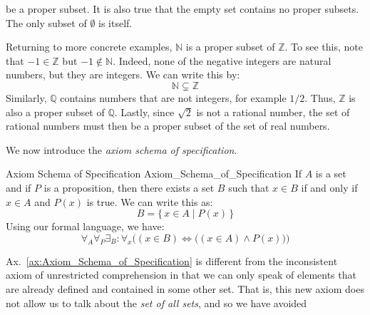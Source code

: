         be a proper subset. It is also true that the empty set contains no
        proper subsets. The only subset of $\emptyset$ is itself.
        \begin{example}
            Returning to more concrete examples, $\mathbb{N}$ is a proper subset
            of $\mathbb{Z}$. To see this, note that $\minus{1}\in\mathbb{Z}$ but
            $\minus{1}\notin\mathbb{N}$. Indeed, none of the negative integers
            are natural numbers, but they are integers. We can write this by:
            \begin{equation}
                \mathbb{N}\subsetneq\mathbb{Z}
            \end{equation}
            Similarly, $\mathbb{Q}$ contains numbers that are not integers,
            for example $1/2$. Thus, $\mathbb{Z}$ is also a proper subset of
            $\mathbb{Q}$. Lastly, since $\sqrt{2}$ is not a rational number, the
            set of rational numbers must then be a proper subset of the set of
            real numbers.
        \end{example}
        We now introduce the \textit{axiom schema of specification}.
        \begin{faxiom}{Axiom Schema of Specification}
                      {Axiom_Schema_of_Specification}
            If $A$ is a set and if $P$ is a proposition, then there exists a set
            $B$ such that $x\in{B}$ if and only if $x\in{A}$ and $P(x)$ is true.
            We can write this as:
            \begin{equation*}
                B=\big\{\,x\in{A}\;|\;P(x)\,\big\}
            \end{equation*}
            Using our formal language, we have:
            \begin{equation*}
                \forall_{A}\forall_{P}\exists_{B}:
                \forall_{x}\Big((x\in{B})\Leftrightarrow
                \big((x\in{A})\land{P}(x)\big)\Big)
            \end{equation*}
        \end{faxiom}
        Ax.~\ref{ax:Axiom_Schema_of_Specification} is different from the
        inconsistent axiom of unrestricted comprehension%
         in that we can only speak of
        elements that are already defined and contained in some other set. That
        is, this new axiom does not allow us to talk about the
        \textit{set of all sets}, and so we have avoided
